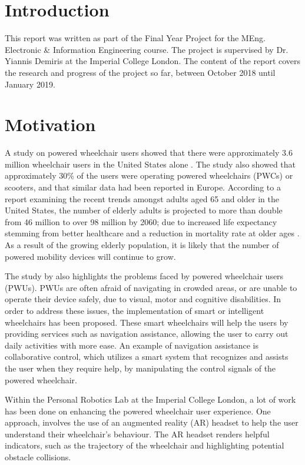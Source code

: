 \documentclass[12pt,a4paper]{report}
\begin{document}
\section{Introduction}
This report was written as part of the Final Year Project for the MEng. Electronic \& Information Engineering course. The project is supervised by Dr. Yiannis Demiris at the Imperial College London. The content of the report covers the research and progress of the project so far, between October 2018 until January 2019.

\section{Motivation}
A study on powered wheelchair users showed that there were approximately 3.6 million wheelchair users in the United States alone \citep{Kairy2014}. The study also showed that approximately 30\% of the users were operating powered wheelchairs (PWCs) or scooters, and that similar data had been reported in Europe. According to a report examining the recent trends amongst adults aged 65 and older in the United States, the number of elderly adults is projected to more than double from 46 million to over 98 million by 2060; due to increased life expectancy stemming from better healthcare and a reduction in mortality rate at older ages \citep{Mather2015}. As a result of the growing elderly population, it is likely that the number of powered mobility devices will continue to grow.

The study by \cite{Kairy2014} also highlights the problems faced by powered wheelchair users (PWUs). PWUs are often afraid of navigating in crowded areas, or are unable to operate their device safely, due to visual, motor and cognitive disabilities. In order to address these issues, the implementation of smart or intelligent wheelchairs has been proposed. These smart wheelchairs will help the users by providing services such as navigation assistance, allowing the user to carry out daily activities with more ease. An example of navigation assistance is collaborative control, \cite{Carlson2012} which utilizes a smart system that recognizes and assists the user when they require help, by manipulating the control signals of the powered wheelchair.

Within the Personal Robotics Lab at the Imperial College London, a lot of work has been done on enhancing the powered wheelchair user experience. One approach, \cite{Zolotas2018} involves the use of an augmented reality (AR) headset to help the user understand their wheelchair's behaviour. The AR headset renders helpful indicators, such as the trajectory of the wheelchair and highlighting potential obstacle collisions.
\end{document}
